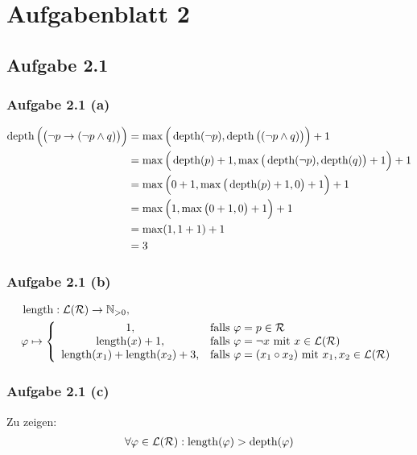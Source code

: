 
\section{Aufgabenblatt 2}
\subsection{Aufgabe 2.1}
\subsubsection{Aufgabe 2.1 (a)}
\begin{align*}
	\operatorname{depth}\Big(\big(\neg p\to(\neg p\wedge q)\big)\Big)
	&=\max\Big(\operatorname{depth}(\neg p),\operatorname{depth}\big((\neg p\wedge q)\big)\Big)+1\\
	&=\max\Big(\operatorname{depth}(p)+1,\max\big(\operatorname{depth}(\neg p),\operatorname{depth}(q)\big)+1\Big)+1\\
	&=\max\Big(0+1,\max\big(\operatorname{depth}(p)+1,0\big)+1\Big)+1\\
	&=\max\Big(1,\max\big(0+1,0\big)+1\Big)+1\\
	&=\max(1,1+1)+1\\
	&=3
\end{align*}

\subsubsection{Aufgabe 2.1 (b)}
\begin{align*}
	&\length:\mathcal{L}(\mathcal{R})\to\N_{>0},\qquad\\
	&\varphi\mapsto\left\lbrace\begin{array}{cl}
		1, & \falls \varphi=p\in\mathcal{R}\\
		\length(x) + 1, & \falls \varphi=\neg x\mit x\in\mathcal{L}(\mathcal{R})\\
		\length(x_1) + \length(x_2) + 3, & \falls \varphi=(x_1\circ x_2)\mit x_1,x_2\in\mathcal{L}(\mathcal{R})%
	\end{array}\right.
\end{align*}

\subsubsection{Aufgabe 2.1 (c)}
Zu zeigen:
\begin{align*}
	\forall\varphi\in\mathcal{L}(\mathcal{R}):\operatorname{length}(\varphi)>\operatorname{depth}(\varphi)
\end{align*}

